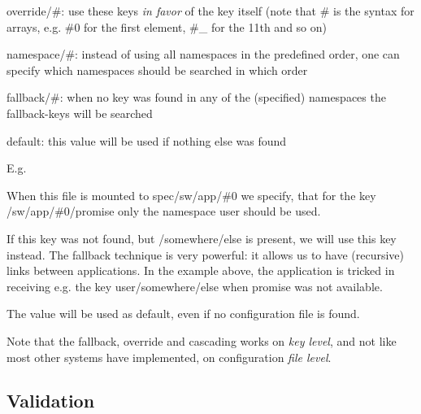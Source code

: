 \begin{DoxyItemize}
\item {\ttfamily override/\#}\+: use these keys {\itshape in favor} of the key itself (note that {\ttfamily \#} is the syntax for arrays, e.\+g. {\ttfamily \#0} for the first element, {\ttfamily \#\+\_} for the 11th and so on)
\item {\ttfamily namespace/\#}\+: instead of using all namespaces in the predefined order, one can specify which namespaces should be searched in which order
\item {\ttfamily fallback/\#}\+: when no key was found in any of the (specified) namespaces the {\ttfamily fallback}-\/keys will be searched
\item {\ttfamily default}\+: this value will be used if nothing else was found
\end{DoxyItemize}

E.\+g.





\begin{DoxyEnumerate}
\item When this file is mounted to {\ttfamily spec/sw/app/\#0} we specify, that for the key {\ttfamily /sw/app/\#0/promise} only the namespace {\ttfamily user} should be used.
\item If this key was not found, but {\ttfamily /somewhere/else} is present, we will use this key instead. The {\ttfamily fallback} technique is very powerful\+: it allows us to have (recursive) links between applications. In the example above, the application is tricked in receiving e.\+g. the key {\ttfamily user/somewhere/else} when {\ttfamily promise} was not available.
\item The value {} will be used as default, even if no configuration file is found.
\end{DoxyEnumerate}

Note that the fallback, override and cascading works on {\itshape key level}, and not like most other systems have implemented, on configuration {\itshape file level}.

\subsection*{Validation}

